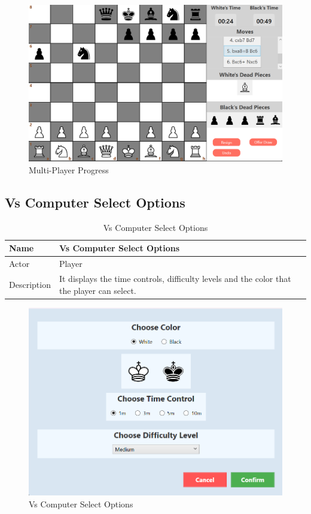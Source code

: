 \documentclass[a4paper,12pt]{article}
\begin{document}
\begin{figure}[H]
    \centering
    \includegraphics[width=0.7\linewidth]{Images/Use Cases/multiplayerProgress.png}
    \caption{Multi-Player Progress}
    \label{fig:multiplayerProgress}
\end{figure}
    

\subsection{Vs Computer Select Options}

\begin{longtable}{|m{}|m{}|}
    \caption{Vs Computer Select Options} \\
    \hline
    Name & Vs Computer Select Options \\
    \hline
    Actor & Player \\
    \hline
    Description & It displays the time controls, difficulty levels and the color that the player can select.  \\ 
    \hline
\end{longtable}

\begin{figure}[H]
    \centering
    \includegraphics[width=0.7\linewidth]{Images/Use Cases/vsComputerSelectOptions.png}
    \caption{Vs Computer Select Options}
    \label{fig:vsComputerSelectOptions}
\end{figure}
    
\end{document}
